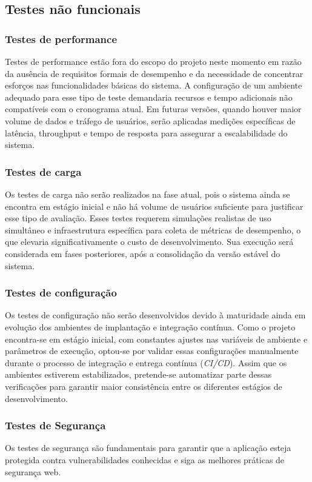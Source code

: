 \subsection{Testes não funcionais}

\subsubsection{Testes de performance}
Testes de performance estão fora do escopo do projeto neste momento em razão da ausência de requisitos formais de desempenho e da necessidade de concentrar esforços nas funcionalidades básicas do sistema.
A configuração de um ambiente adequado para esse tipo de teste demandaria recursos e tempo adicionais não compatíveis com o cronograma atual. 
Em futuras versões, quando houver maior volume de dados e tráfego de usuários, serão aplicadas medições específicas de latência, throughput e tempo de resposta para assegurar a escalabilidade do sistema.
\subsubsection{Testes de carga}
Os testes de carga não serão realizados na fase atual, pois o sistema ainda se encontra em estágio inicial e não há volume de usuários suficiente para justificar esse tipo de avaliação. 
Esses testes requerem simulações realistas de uso simultâneo e infraestrutura específica para coleta de métricas de desempenho, o que elevaria significativamente o custo de desenvolvimento. 
Sua execução será considerada em fases posteriores, após a consolidação da versão estável do sistema.
\subsubsection{Testes de configuração}
Os testes de configuração não serão desenvolvidos devido à maturidade ainda em evolução dos ambientes de implantação e integração contínua. 
Como o projeto encontra-se em estágio inicial, com constantes ajustes nas variáveis de ambiente e parâmetros de execução, 
optou-se por validar essas configurações manualmente durante o processo de integração e entrega contínua (\textit{CI/CD}). 
Assim que os ambientes estiverem estabilizados, pretende-se automatizar parte dessas verificações para garantir maior consistência entre os diferentes estágios de desenvolvimento.

\subsubsection{Testes de Segurança}
Os testes de segurança são fundamentais para garantir que a aplicação esteja protegida contra vulnerabilidades conhecidas e siga as melhores práticas de segurança web. 

